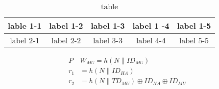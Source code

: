 \documentclass[UTF8]{ctexart}
\begin{document}
\begin{table}[!hbp]
\caption{table}
\begin{tabular}{|c|c|c|c|c|}
\hline
lable 1-1 & label 1-2 & label 1-3 & label 1 -4 & label 1-5 \\
\hline
label 2-1 & label 2-2 & label 3-3 & label 4-4 & label 5-5 \\
\hline
\end{tabular}

\begin{align}
    P&W_{MU}=h(N\|ID_{MU}) \\
    r_1&=h(N\|ID_{HA})\\
    r_2&=h(N\|TD_{MU})\oplus{ID_{NA}}\oplus{ID_{MU}}
\end{align}

\end{table}
\end{document}
